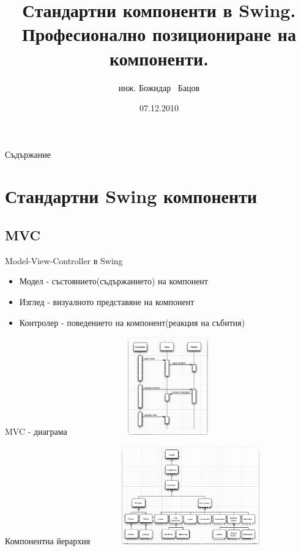 \documentclass{beamer}
\title{Стандартни компоненти в Swing. Професионално позициониране на компоненти.}
\author{инж. Божидар ~Бацов}
\institute{Drow Ltd.}
\date{07.12.2010}
\begin{document}
\begin{frame}
  \titlepage
\end{frame}

\begin{frame}{Съдържание}
  \tableofcontents[pausesections]
\end{frame}

\section{Стандартни Swing компоненти}

\subsection{MVC}

\begin{frame}{Model-View-Controller в Swing}
  \transdissolve
  \begin{itemize}
  \item Модел - състоянието(съдържанието) на компонент
  \item Изглед - визуалното представяне на компонент
  \item Контролер - поведението на компонент(реакция на събития)
  \end{itemize}
\end{frame}


\begin{frame}{MVC - диаграма}
  \transdissolve
  \includegraphics[width=320px,height=160px]{images/mvc.png}  
\end{frame}

\begin{frame}{Компонентна йерархия}
  \transdissolve
  \includegraphics[width=320px,height=160px]{images/all_components.png}
\end{frame}
\end{document}
